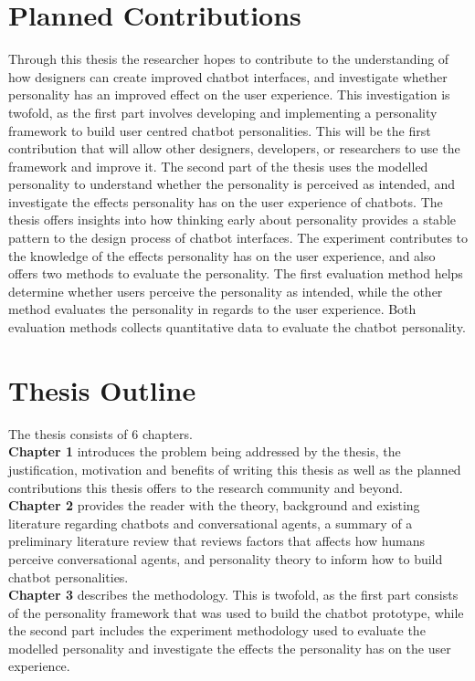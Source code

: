 \section{Planned Contributions}
Through this thesis the researcher hopes to contribute to the understanding of how designers can create improved chatbot interfaces, and investigate whether personality has an improved effect on the user experience. This investigation is twofold, as the first part involves developing and implementing a personality framework to build user centred chatbot personalities. This will be the first contribution that will allow other designers, developers, or researchers to use the framework and improve it. The second part of the thesis uses the modelled personality to understand whether the personality is perceived as intended, and investigate the effects personality has on the user experience of chatbots. The thesis offers insights into how thinking early about personality provides a stable pattern to the design process of chatbot interfaces. The experiment contributes to the knowledge of the effects personality has on the user experience, and also offers two methods to evaluate the personality. The first evaluation method helps determine whether users perceive the personality as intended, while the other method evaluates the personality in regards to the user experience. Both evaluation methods collects quantitative data to evaluate the chatbot personality.

\section{Thesis Outline}

The thesis consists of 6 chapters.\\

\textbf{Chapter 1} introduces the problem being addressed by the thesis, the justification, motivation and benefits of writing this thesis as well as the planned contributions this thesis offers to the research community and beyond.\\

\textbf{Chapter 2} provides the reader with the theory, background and existing literature regarding chatbots and conversational agents, a summary of a preliminary literature review that reviews factors that affects how humans perceive conversational agents, and personality theory to inform how to build chatbot personalities.\\

\textbf{Chapter 3} describes the methodology. This is twofold, as the first part consists of the personality framework that was used to build the chatbot prototype, while the second part includes the experiment methodology used to evaluate the modelled personality and investigate the effects the personality has on the user experience.\\

